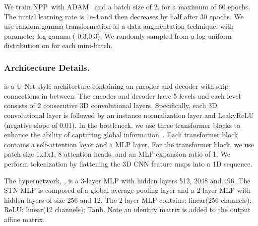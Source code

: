 \documentclass[runningheads]{llncs}
\newcommand{\modelname}{NPP}
\begin{document}
We train \modelname~with ADAM~\cite{Kingma2014} and a batch size of 2, for a maximum of 60 epochs. The initial learning rate is 1e-4 and then decreases by half after 30 epochs. 
We use random gamma transformation as a data augmentation technique, with parameter log gamma (-0.3,0.3). We randomly sampled  from a log-uniform distribution on  for each mini-batch.


\subsubsection{Architecture Details.}
 is a U-Net-style architecture containing an encoder and decoder with skip connections in between. The encoder and decoder have 5 levels and each level consists of 2 consecutive 3D convolutional layers. Specifically, each 3D convolutional layer is followed by an instance normalization layer and LeakyReLU (negative slope of 0.01). In the bottleneck, we use three transformer blocks to enhance the ability of capturing global information~\cite{vaswani2017attention}. Each transformer block contains a self-attention layer and a MLP layer. For the transformer block, we use patch size 1x1x1, 8 attention heads, and an MLP expansion ratio of 1. We perform tokenization by flattening the 3D CNN feature maps into a 1D sequence. 


The hypernetwork, , is a 3-layer MLP with hidden layers 512, 2048 and 496. The STN MLP is composed of a global average pooling layer and a 2-layer MLP with hidden layers of size 256 and 12. The 2-layer MLP contains: linear(256 channels); ReLU; linear(12 channels); Tanh. Note an identity matrix is added to the output affine matrix.
\end{document}
